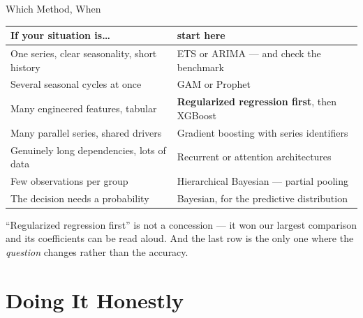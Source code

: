 \documentclass[aspectratio=169, 11pt]{beamer}
\begin{document}
\begin{frame}{Which Method, When}
  \begin{center}
    {\small
    \begin{tabular}{p{4.6cm}p{7.7cm}}
      \toprule
      \textbf{If your situation is\ldots} & \textbf{start here} \\
      \midrule
      One series, clear seasonality, short history & ETS or ARIMA --- and check the benchmark \\[1pt]
      Several seasonal cycles at once & GAM or Prophet \\[1pt]
      Many engineered features, tabular & \textbf{Regularized regression first}, then XGBoost \\[1pt]
      Many parallel series, shared drivers & Gradient boosting with series identifiers \\[1pt]
      Genuinely long dependencies, lots of data & Recurrent or attention architectures \\[1pt]
      Few observations per group & Hierarchical Bayesian --- partial pooling \\[1pt]
      The decision needs a probability & Bayesian, for the predictive distribution \\
      \bottomrule
    \end{tabular}
    }
  \end{center}

  \vspace{0.05cm}
  ``Regularized regression first'' is not a concession --- it won our largest comparison and its
  coefficients can be read aloud. And the last row is the only one where the \emph{question}
  changes rather than the accuracy.
\end{frame}

\section{Doing It Honestly}

\end{document}
